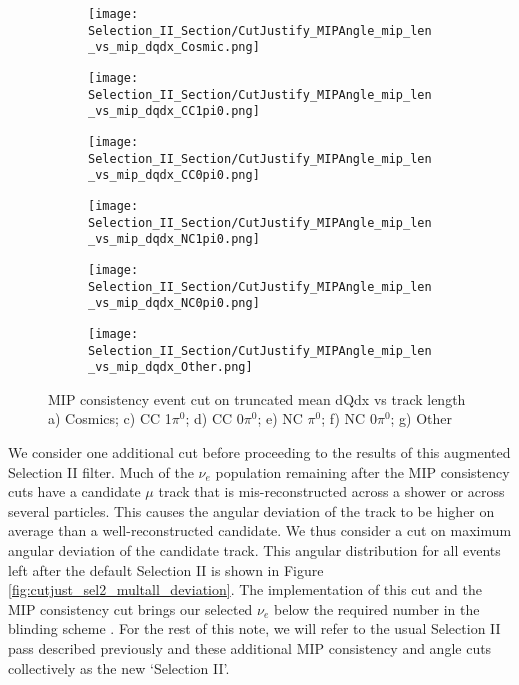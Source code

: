 \documentclass{article}
\begin{document}
\begin{figure}[t!]
\centering
  \begin{subfigure}[t]{0.35\textwidth}
    \centering
\texttt{[image: Selection\_II\_Section/CutJustify\_MIPAngle\_mip\_len\_vs\_mip\_dqdx\_Cosmic.png]}
    \caption{ }
  \end{subfigure} 
  \hspace{3mm}
  \begin{subfigure}[t]{0.35\textwidth}
    \centering
\texttt{[image: Selection\_II\_Section/CutJustify\_MIPAngle\_mip\_len\_vs\_mip\_dqdx\_CC1pi0.png]}
    \caption{ }
  \end{subfigure} 
  \hspace{3mm}
  \begin{subfigure}[t]{0.35\textwidth}
    \centering
\texttt{[image: Selection\_II\_Section/CutJustify\_MIPAngle\_mip\_len\_vs\_mip\_dqdx\_CC0pi0.png]}
    \caption{ }
  \end{subfigure} 
    \hspace{3mm}
  \begin{subfigure}[t]{0.35\textwidth}
    \centering
\texttt{[image: Selection\_II\_Section/CutJustify\_MIPAngle\_mip\_len\_vs\_mip\_dqdx\_NC1pi0.png]}
    \caption{ }
  \end{subfigure} 
  \hspace{3mm}
  \begin{subfigure}[t]{0.35\textwidth}
    \centering
\texttt{[image: Selection\_II\_Section/CutJustify\_MIPAngle\_mip\_len\_vs\_mip\_dqdx\_NC0pi0.png]}
    \caption{ }
  \end{subfigure}
    \hspace{3mm}
  \begin{subfigure}[t]{0.35\textwidth}
    \centering
\texttt{[image: Selection\_II\_Section/CutJustify\_MIPAngle\_mip\_len\_vs\_mip\_dqdx\_Other.png]}
    \caption{ }
  \end{subfigure} 
\caption{ MIP consistency event cut on truncated mean dQdx vs track length a) Cosmics; c) CC 1$\pi^0$; d) CC 0$\pi^0$; e) NC $\pi^0$; f) NC 0$\pi^0$; g) Other }
\label{fig:cutjust_mip_2d}
\end{figure}

We consider one additional cut before proceeding to the results of this augmented Selection II filter.  Much of the $\nu_e$ population remaining after the MIP consistency cuts have a candidate $\mu$ track that is mis-reconstructed across a shower or across several particles.  This causes the angular deviation of the track to be higher on average than a well-reconstructed candidate.  We thus consider a cut on maximum angular deviation of the candidate track.  This angular distribution for all events left after the default Selection II is shown in Figure \ref{fig:cutjust_sel2_multall_deviation}.  The implementation of this cut and the MIP consistency cut brings our selected $\nu_e$ below the required number in the blinding scheme \cite{bib:jz_unblinding_note}.  For the rest of this note, we will refer to the usual Selection II pass described previously and these additional MIP consistency and angle cuts collectively as the new `Selection II'.
\end{document}
